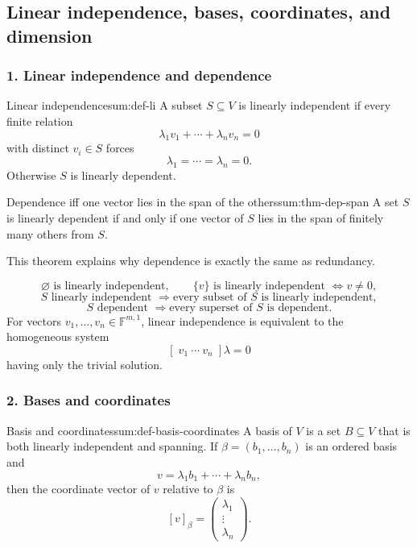 \subsection{Linear independence, bases, coordinates, and dimension}

\subsubsection*{1. Linear independence and dependence}

\begin{definition}{Linear independence}{sum:def-li}
A subset \(S\subseteq V\) is linearly independent if every finite relation
\[
\lambda_1 v_1+\cdots+\lambda_n v_n = 0
\]
with distinct \(v_i\in S\) forces
\[
\lambda_1=\cdots=\lambda_n=0.
\]
Otherwise \(S\) is linearly dependent.
\end{definition}

\begin{theorem}{Dependence iff one vector lies in the span of the others}{sum:thm-dep-span}
A set \(S\) is linearly dependent if and only if one vector of \(S\) lies in the span of finitely many others from \(S\).
\end{theorem}

This theorem explains why dependence is exactly the same as redundancy.

\begin{keyformula}[title={Key Facts: quick tests for independence}]
\[
\varnothing \text{ is linearly independent},
\qquad
\{v\} \text{ is linearly independent } \iff v\neq 0,
\]
\[
S \text{ linearly independent } \Rightarrow \text{every subset of } S \text{ is linearly independent},
\]
\[
S \text{ dependent } \Rightarrow \text{every superset of } S \text{ is dependent}.
\]
For vectors \(v_1,\dots,v_n\in \mathbb{F}^{m,1}\), linear independence is equivalent to the homogeneous system
\[
[\;v_1\ \cdots\ v_n\;]\lambda=0
\]
having only the trivial solution.
\end{keyformula}

\subsubsection*{2. Bases and coordinates}

\begin{definition}{Basis and coordinates}{sum:def-basis-coordinates}
A basis of \(V\) is a set \(B\subseteq V\) that is both linearly independent and spanning.
If \(\beta=(b_1,\dots,b_n)\) is an ordered basis and
\[
v=\lambda_1 b_1+\cdots+\lambda_n b_n,
\]
then the coordinate vector of \(v\) relative to \(\beta\) is
\[
[v]_\beta=
\begin{pmatrix}
\lambda_1\\ \vdots\\ \lambda_n
\end{pmatrix}.
\]
\end{definition}

